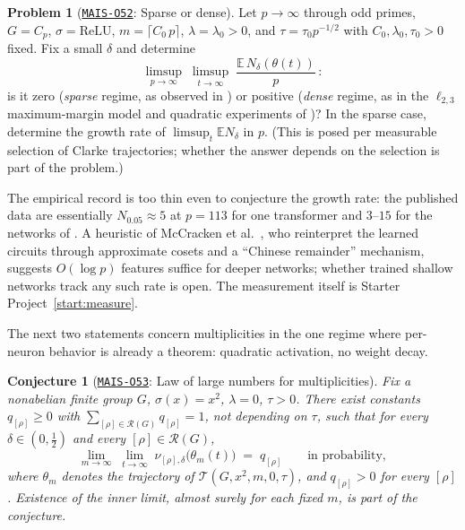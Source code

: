 \documentclass[11pt]{amsart}
\newcommand{\Oid}[1]{\href{https://github.com/lionellevine/MAIS/blob/main/open-problems/MAIS-O#1.md}{\texttt{MAIS-O#1}}}
\theoremstyle{plain}
\newtheorem{conjecture}[theorem]{Conjecture}
\theoremstyle{definition}
\newtheorem{problem}[theorem]{Problem}
\newcommand{\E}{\mathbb{E}}
\newcommand{\Rcl}{\mathcal{R}}
\begin{document}
\begin{problem}[\Oid{52}: Sparse or dense]\label{prob:sparse}
Let $p\to\infty$ through odd primes, $G = C_p$, $\sigma = \mathrm{ReLU}$, $m = \lceil C_0\, p \rceil$, $\lambda = \lambda_0 > 0$, and $\tau = \tau_0 p^{-1/2}$ with $C_0,\lambda_0,\tau_0>0$ fixed. Fix a small $\delta$ and determine
\[
   \limsup_{p \to \infty} \; \limsup_{t \to \infty} \; \frac{\E\, N_\delta(\theta(t))}{p}\,:
\]
is it zero (\emph{sparse} regime, as observed in \cite{nanda2023,chughtai2023}) or positive (\emph{dense} regime, as in the $\ell_{2,3}$ maximum-margin model and quadratic experiments of \cite{morwani2024})? In the sparse case, determine the growth rate of $\limsup_t \E N_\delta$ in $p$. (This is posed per measurable selection of Clarke trajectories; whether the answer depends on the selection is part of the problem.)
\end{problem}

The empirical record is too thin even to conjecture the growth rate: the published data are essentially $N_{0.05} \approx 5$ at $p = 113$ for one transformer \cite{nanda2023} and $3$--$15$ for the networks of \cite{chughtai2023}. A heuristic of McCracken et al.~\cite{mccracken2025}, who reinterpret the learned circuits through approximate cosets and a ``Chinese remainder'' mechanism, suggests $O(\log p)$ features suffice for deeper networks; whether trained shallow networks track any such rate is open. The measurement itself is Starter Project~\ref{start:measure}.

The next two statements concern multiplicities in the one regime where per-neuron behavior is already a theorem: quadratic activation, no weight decay.

\begin{conjecture}[\Oid{53}: Law of large numbers for multiplicities]\label{conj:lln}
Fix a nonabelian finite group $G$, $\sigma(x) = x^2$, $\lambda = 0$, $\tau > 0$. There exist constants $q_{[\rho]} \geq 0$ with $\sum_{[\rho] \in \Rcl(G)} q_{[\rho]} = 1$, not depending on $\tau$, such that for every $\delta \in (0, \tfrac12)$ and every $[\rho] \in \Rcl(G)$,
\[
   \lim_{m \to \infty} \; \lim_{t \to \infty} \; \nu_{[\rho],\delta}\bigl(\theta_m(t)\bigr) \;=\; q_{[\rho]}
   \qquad \text{in probability},
\]
where $\theta_m$ denotes the trajectory of $\mathcal{T}(G, x^2, m, 0, \tau)$, and $q_{[\rho]} > 0$ for every $[\rho]$. Existence of the inner limit, almost surely for each fixed $m$, is part of the conjecture.
\end{conjecture}
\end{document}
